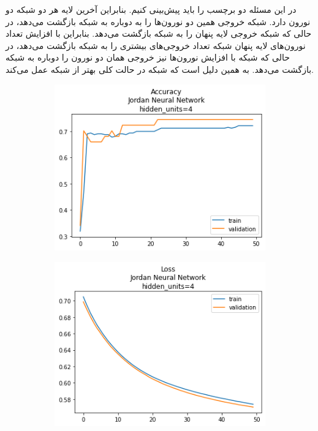 \documentclass[12pt, a4paper]{article}
\begin{document}
در این مسئله دو برچسب را باید پیش‌بینی کنیم. بنابراین آخرین لایه هر دو شبکه دو نورون دارد. شبکه 
خروجی همین دو نورون‌ها را به دوباره به شبکه بازگشت می‌دهد، در حالی که شبکه  خروجی لایه پنهان را به
شبکه بازگشت می‌دهد. بنابراین با افزایش تعداد نورون‌های لایه پنهان شبکه  تعداد خروجی‌های بیشتری را
به شبکه بازگشت می‌دهد، در حالی که شبکه  با افزایش نورون‌ها نیز خروجی همان دو نورون را دوباره به
شبکه بازگشت می‌دهد. به همین دلیل است که شبکه  در حالت کلی بهتر از شبکه  عمل می‌کند.

\clearpage

\begin{figure}
    \centering
    \begin{subfigure}{0.45\linewidth}
        \includegraphics[width=0.9\linewidth]{images/q1/jordan/acc_Jordan Neural Networkhidden_units=4.png}
    \end{subfigure}
    \hfill
    \begin{subfigure}{0.45\linewidth}
        \includegraphics[width=0.9\linewidth]{images/q1/jordan/loss_Jordan Neural Networkhidden_units=4.png}

\end{subfigure}
\end{figure}
\end{document}
